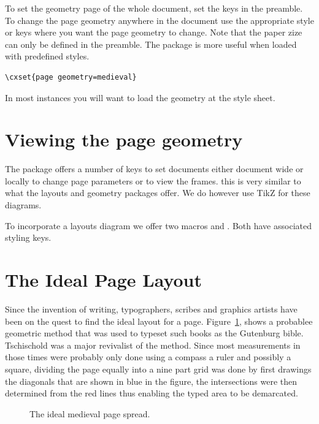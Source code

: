To set the geometry page of the whole document, set the keys in the preamble. To change the page geometry anywhere in the document use the appropriate style or keys where you want the page geometry to change.
Note that the paper zize can only be defined in the preamble. The package is more useful when loaded with predefined styles.

\begin{tcolorbox}
\begin{lstlisting}
\cxset{page geometry=medieval}
\end{lstlisting}
\end{tcolorbox}

In most instances you will want to load the geometry at the style sheet.


\section{Viewing the page geometry}

The package offers a number of keys to set documents either document wide or locally to change page 
parameters or to view the frames. this is very similar to what the layouts and geometry packages offer. We do
however use TikZ for these diagrams.

To incorporate a layouts diagram we offer two macros  and . Both have associated styling keys.
\medskip

\section{The Ideal Page Layout}

Since the invention of writing, typographers, scribes and graphics artists have been on the quest to find the ideal
layout for a page. Figure~\ref{fig:medieval}, shows a probablee geometric method that was used to typeset such books as the Gutenburg bible. Tschischold was a major revivalist of the method. Since most measurements in those times were probably only done using a compass a ruler and possibly a square, dividing the page equally into a nine part grid was done by first drawings the diagonals that are shown in blue in the figure, the intersections were then determined from the red lines thus enabling the typed area to be demarcated. 


\begin{figure}[htbp]
\pgfmathsetmacro{}
\pgfmathsetmacro{}
\drawclassicspread
\caption{The ideal medieval page spread.}
\label{fig:medieval}
\end{figure}

